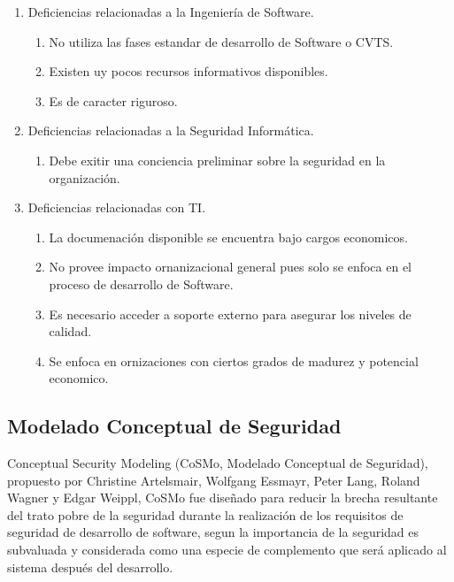 \documentclass[runningheads,a4paper]{llncs}
\begin{document}
\begin{enumerate}
	\item Deficiencias relacionadas a la Ingeniería de \gls{Software}.
		\begin{enumerate}
			\item No utiliza las fases estandar de desarrollo de \gls{Software} o \gls{CVTS}. 
			\item Existen uy pocos recursos informativos disponibles.
			\item Es de caracter riguroso.\\
			
		\end{enumerate}
	\item Deficiencias relacionadas a la Seguridad Informática.
		\begin{enumerate}
			\item Debe exitir una conciencia preliminar sobre la seguridad en la organización.\\
			
		\end{enumerate}
	\item Deficiencias relacionadas con \gls{TI}.
		\begin{enumerate}
			\item La documenación disponible se encuentra bajo cargos economicos.
			\item No provee impacto ornanizacional general pues solo se enfoca en el proceso de desarrollo de \gls{Software}.
			\item Es necesario acceder a soporte externo para asegurar los niveles de calidad.
			\item Se enfoca en ornizaciones con ciertos grados de madurez y potencial economico.
			
		\end{enumerate}
\end{enumerate}


\subsection{Modelado Conceptual de Seguridad}
Conceptual Security Modeling  (CoSMo, Modelado Conceptual de Seguridad), propuesto por Christine Artelsmair, Wolfgang Essmayr, Peter Lang, Roland Wagner y Edgar Weippl, \gls{CoSMo} fue diseñado para reducir la brecha resultante del trato pobre de la seguridad durante la realización de los requisitos de seguridad de desarrollo de software, segun \cite{CoSMoIntroduction} la importancia de la seguridad es subvaluada y considerada como una especie de complemento que será aplicado al sistema después del desarrollo.
\end{document}
